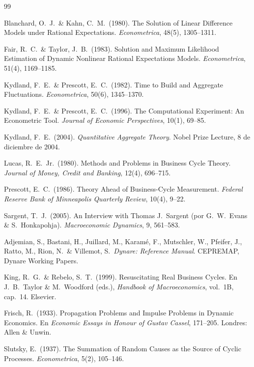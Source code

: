 \documentclass[11pt,a4paper]{report}
\begin{document}
\begin{thebibliography}{99}

 Blanchard, O.~J.\ \& Kahn, C.~M.\ (1980). The Solution of
Linear Difference Models under Rational Expectations. \emph{Econometrica},
48(5), 1305--1311.

 Fair, R.~C.\ \& Taylor, J.~B.\ (1983). Solution and Maximum
Likelihood Estimation of Dynamic Nonlinear Rational Expectations Models.
\emph{Econometrica}, 51(4), 1169--1185.

 Kydland, F.~E.\ \& Prescott, E.~C.\ (1982). Time to Build and
Aggregate Fluctuations. \emph{Econometrica}, 50(6), 1345--1370.

 Kydland, F.~E.\ \& Prescott, E.~C.\ (1996). The Computational
Experiment: An Econometric Tool. \emph{Journal of Economic Perspectives},
10(1), 69--85.

 Kydland, F.~E.\ (2004). \emph{Quantitative Aggregate
Theory}. Nobel Prize Lecture, 8 de diciembre de 2004.

 Lucas, R.~E.\ Jr.\ (1980). Methods and Problems in Business
Cycle Theory. \emph{Journal of Money, Credit and Banking}, 12(4), 696--715.

 Prescott, E.~C.\ (1986). Theory Ahead of Business-Cycle
Measurement. \emph{Federal Reserve Bank of Minneapolis Quarterly Review},
10(4), 9--22.

 Sargent, T.~J.\ (2005). An Interview with Thomas J.\
Sargent (por G.~W.\ Evans \& S.~Honkapohja). \emph{Macroeconomic Dynamics},
9, 561--583.

 Adjemian, S., Bastani, H., Juillard, M., Karamé, F.,
Mutschler, W., Pfeifer, J., Ratto, M., Rion, N.\ \& Villemot, S.\
\emph{Dynare: Reference Manual}. CEPREMAP, Dynare Working Papers.

\bibitem{kingrebelo1999} King, R.~G.\ \& Rebelo, S.~T.\ (1999). Resuscitating
Real Business Cycles. En J.~B.\ Taylor \& M.\ Woodford (eds.), \emph{Handbook of
Macroeconomics}, vol.~1B, cap.~14. Elsevier.

 Frisch, R.\ (1933). Propagation Problems and Impulse Problems in
Dynamic Economics. En \emph{Economic Essays in Honour of Gustav Cassel}, 171--205.
Londres: Allen \& Unwin.

 Slutsky, E.\ (1937). The Summation of Random Causes as the Source
of Cyclic Processes. \emph{Econometrica}, 5(2), 105--146.


\end{thebibliography}
\end{document}
